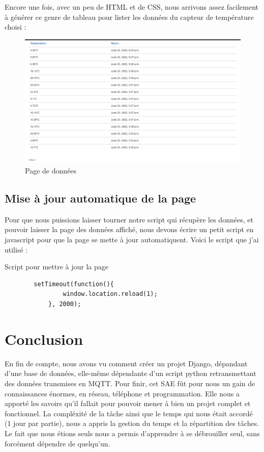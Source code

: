 \documentclass[12pt, a4paper]{article}
\begin{document}
	\newpage

	Encore une fois, avec un peu de HTML et de CSS, nous arrivons assez facilement à générer ce 
	genre de tableau pour lister les données du capteur de température choisi :\\[1cm]
	\begin{figure}[H]
		\centering
		\includegraphics[width=1\textwidth]{../img/data.png}
		\caption{Page de données}
		\label{fig:data}
	\end{figure}
	\newpage 

	\subsection{Mise à jour automatique de la page}

	Pour que nous puissions laisser tourner notre script qui récupère les données, et 
	pouvoir laisser la page des données affiché, nous devons écrire un petit script en javascript
	pour que la page se mette à jour automatiquent. Voici le script que j'ai utilisé :

	\begin{listing}[H]
		\caption{Script pour mettre à jour la page}
		\label{lst:script}
		\begin{verbatim}
		setTimeout(function(){
        		window.location.reload(1);
    		}, 2000);
		\end{verbatim}
	\end{listing}

	\section{Conclusion}
	En fin de compte, nous avons vu comment créer un projet Django, dépandant d'une base de données, 
	elle-même dépendante d'un script python retransmettant des données transmises en MQTT. 
	Pour finir, cet SAE fût pour nous un gain de connaissances énormes, en réseau, téléphone et 
	programmation. Elle nous a apporté les savoirs qu'il fallait pour pouvoir mener à bien 
	un projet complet et fonctionnel. La compléxité de la tâche ainsi que le temps qui nous était
	accordé (1 jour par partie), nous a appris la gestion du temps et la répartition des tâches. 
	Le fait que nous étions seuls nous a permis d'apprendre à se débrouiller seul, sans 
	forcément dépendre de quelqu'un. 

	
\end{document}
